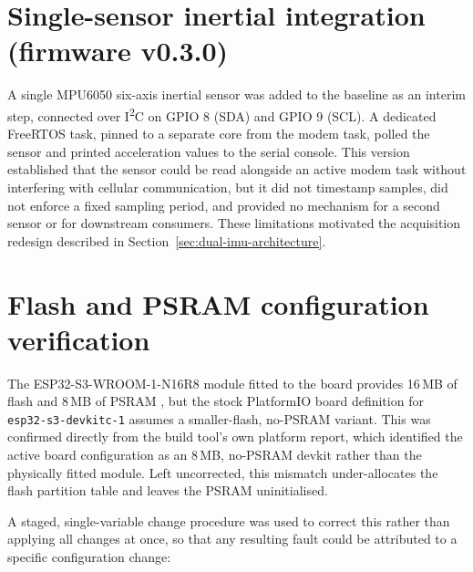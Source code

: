 \section{Single-sensor inertial integration (firmware v0.3.0)}
\label{sec:single-imu}

A single MPU6050 six-axis inertial sensor was added to the baseline as an interim step, connected over I\textsuperscript{2}C on GPIO 8 (SDA) and GPIO 9 (SCL). A dedicated FreeRTOS task, pinned to a separate core from the modem task, polled the sensor and printed acceleration values to the serial console. This version established that the sensor could be read alongside an active modem task without interfering with cellular communication, but it did not timestamp samples, did not enforce a fixed sampling period, and provided no mechanism for a second sensor or for downstream consumers. These limitations motivated the acquisition redesign described in Section~\ref{sec:dual-imu-architecture}.

\section{Flash and PSRAM configuration verification}
\label{sec:flash-psram}

The ESP32-S3-WROOM-1-N16R8 module fitted to the board provides 16\,MB of flash and 8\,MB of PSRAM \cite{makerfabsa7670x}, but the stock PlatformIO board definition for \texttt{esp32-s3-devkitc-1} assumes a smaller-flash, no-PSRAM variant. This was confirmed directly from the build tool's own platform report, which identified the active board configuration as an 8\,MB, no-PSRAM devkit rather than the physically fitted module. Left uncorrected, this mismatch under-allocates the flash partition table and leaves the PSRAM uninitialised.

A staged, single-variable change procedure was used to correct this rather than applying all changes at once, so that any resulting fault could be attributed to a specific configuration change:

